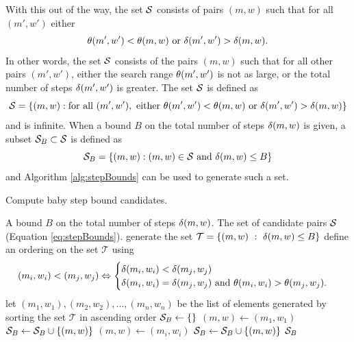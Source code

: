 \documentclass{ucalgthes1}
\theoremstyle{definition}
\begin{document}
With this out of the way, the set $\mathcal S$ consists of pairs $(m, w)$ such that for all $(m', w')$ either
\[
	\theta(m', w') < \theta(m, w) \textrm{ or } \delta(m', w') > \delta(m, w).
\]
In other words, the set $\mathcal S$ consists of the pairs $(m, w)$ such that for all other pairs $(m', w')$, either the search range $\theta(m', w')$ is not as large, or the total number of steps $\delta(m', w')$ is greater.  The set $\mathcal S$ is defined as
\begin{equation}
\label{eq:stepBounds}
  \mathcal S = \left\{ (m, w) : \textrm{for all } (m', w'), \textrm{ either }  \theta(m', w') < \theta(m, w) \textrm{ or } \delta(m', w') > \delta(m, w) \right\}
\end{equation}
and is infinite.  When a bound $B$ on the total number of steps $\delta(m, w)$ is given, a subset $\mathcal S_B \subset \mathcal S$ is defined as
\begin{equation}
\label{eq:stepBoundsB}
   \mathcal S_B = \left\{ (m, w) : (m, w) \in \mathcal S \textrm{ and } \delta(m, w) \le B \right\}
\end{equation}
and Algorithm \ref{alg:stepBounds} can be used to generate such a set.

\begin{algorithm}[htb]
\caption{Compute baby step bound candidates.}
\label{alg:stepBounds}
\begin{algorithmic}[1]
\Require A bound $B$ on the total number of steps $\delta(m, w)$.
\Ensure The set of candidate pairs $\mathcal S$ (Equation \eqref{eq:stepBounds}).
\State generate the set $\mathcal T = \{(m, w) ~:~ \delta(m, w) \le B\}$
\State define an ordering on the set $\mathcal T$ using
\[
(m_i, w_i) < (m_j, w_j) \Leftrightarrow \begin{cases}
	\delta(m_i, w_i) < \delta(m_j, w_j) \\
	\delta(m_i, w_i) = \delta(m_j, w_j) \textrm{ and } \theta(m_i, w_i) > \theta(m_j, w_j).
\end{cases}
\]
\State let $(m_1, w_1), (m_2, w_2), ..., (m_n, w_n)$ be the list of elements generated by sorting the set $\mathcal T$ in ascending order
\State $\mathcal S_B \gets \{\}$
\State $(m, w) \gets (m_1, w_1)$
		\State $\mathcal S_B \gets \mathcal S_B \cup \{(m, w)\}$
		\State $(m, w) \gets (m_i, w_i)$
	\EndIf
\EndFor
\State $\mathcal S_B \gets \mathcal S_B \cup \{(m, w)\}$
\State \Return $\mathcal S_B$
\end{algorithmic}
\end{algorithm}
\end{document}
